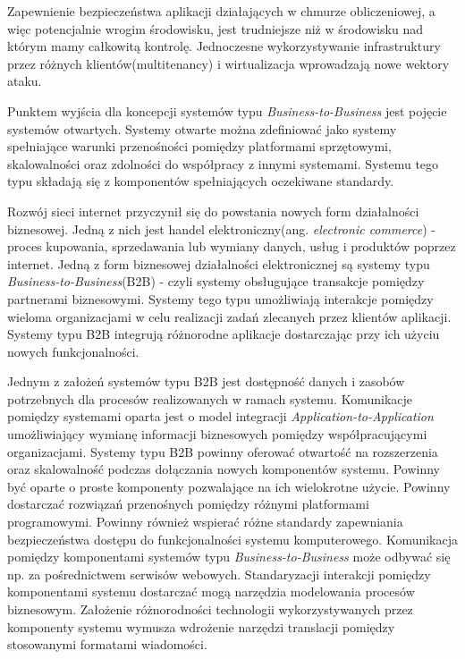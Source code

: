 	Zapewnienie bezpieczeństwa aplikacji działających w chmurze obliczeniowej, a więc potencjalnie wrogim środowisku, jest trudniejsze niż w środowisku nad którym mamy całkowitą kontrolę. Jednoczesne wykorzystywanie infrastruktury przez różnych klientów(multitenancy) i wirtualizacja wprowadzają nowe wektory ataku. 


\label{sec:wymaganiaB2B}

Punktem wyjścia dla koncepcji systemów typu \textit{Business-to-Business} jest pojęcie systemów otwartych. Systemy otwarte można zdefiniować jako systemy spełniające warunki przenośności pomiędzy platformami sprzętowymi, skalowalności oraz zdolności do współpracy z innymi systemami\cite{Kajan04}. Systemu tego typu składają się z komponentów spełniających oczekiwane standardy. 

Rozwój sieci internet przyczynił się do powstania nowych form działalności biznesowej. Jedną z nich jest handel elektroniczny(ang. \textit{electronic commerce}) - proces kupowania, sprzedawania lub wymiany danych, usług i produktów poprzez internet. Jedną z form biznesowej działalności elektronicznej są systemy typu \textit{Business-to-Business}(B2B) - czyli systemy obsługujące transakcje pomiędzy partnerami biznesowymi. Systemy tego typu umożliwiają interakcje pomiędzy wieloma organizacjami w celu realizacji zadań zlecanych przez klientów aplikacji. Systemy typu B2B integrują różnorodne aplikacje dostarczając przy ich użyciu nowych funkcjonalności. 

Jednym z założeń systemów typu B2B jest dostępność danych i zasobów potrzebnych dla procesów realizowanych w ramach systemu. Komunikacje pomiędzy systemami oparta jest o model integracji \textit{Application-to-Application} umożliwiający wymianę informacji biznesowych pomiędzy współpracującymi organizacjami. Systemy typu B2B powinny oferować otwartość na rozszerzenia oraz skalowalność podczas dołączania nowych komponentów systemu. Powinny być oparte o proste komponenty pozwalające na ich wielokrotne użycie. Powinny dostarczać rozwiązań przenośnych pomiędzy różnymi platformami programowymi. Powinny również wspierać różne standardy zapewniania bezpieczeństwa dostępu do funkcjonalności systemu komputerowego. Komunikacja pomiędzy komponentami systemów typu \textit{Business-to-Business} może odbywać się np. za pośrednictwem serwisów webowych. Standaryzacji interakcji pomiędzy komponentami systemu dostarczać mogą narzędzia modelowania procesów biznesowym. Założenie różnorodności technologii wykorzystywanych przez komponenty systemu wymusza wdrożenie narzędzi translacji pomiędzy stosowanymi formatami wiadomości.

